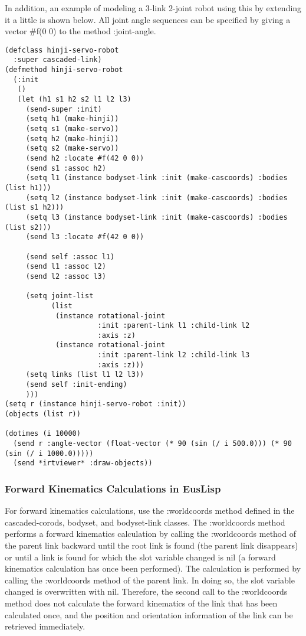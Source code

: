 In addition, an example of modeling a 3-link 2-joint robot using this by extending it a little is shown below. All joint angle sequences can be specified by giving a vector \#f(0 0) to the method :joint-angle.
{\baselineskip=10pt
\begin{verbatim}
(defclass hinji-servo-robot
  :super cascaded-link)
(defmethod hinji-servo-robot
  (:init
   ()
   (let (h1 s1 h2 s2 l1 l2 l3)
     (send-super :init)
     (setq h1 (make-hinji))
     (setq s1 (make-servo))
     (setq h2 (make-hinji))
     (setq s2 (make-servo))
     (send h2 :locate #f(42 0 0))
     (send s1 :assoc h2)
     (setq l1 (instance bodyset-link :init (make-cascoords) :bodies (list h1)))
     (setq l2 (instance bodyset-link :init (make-cascoords) :bodies (list s1 h2)))
     (setq l3 (instance bodyset-link :init (make-cascoords) :bodies (list s2)))
     (send l3 :locate #f(42 0 0))

     (send self :assoc l1)
     (send l1 :assoc l2)
     (send l2 :assoc l3)

     (setq joint-list
           (list
            (instance rotational-joint
                      :init :parent-link l1 :child-link l2
                      :axis :z)
            (instance rotational-joint
                      :init :parent-link l2 :child-link l3
                      :axis :z)))
     (setq links (list l1 l2 l3))
     (send self :init-ending)
     )))
(setq r (instance hinji-servo-robot :init))
(objects (list r))

(dotimes (i 10000)
  (send r :angle-vector (float-vector (* 90 (sin (/ i 500.0))) (* 90 (sin (/ i 1000.0)))))
  (send *irtviewer* :draw-objects))
\end{verbatim}
}

\subsubsection{Forward Kinematics Calculations in EusLisp}

For forward kinematics calculations, use the :worldcoords method defined in the cascaded-corods, bodyset, and bodyset-link classes.
The :worldcoords method performs a forward kinematics calculation by calling the :worldcoords method of the parent link backward until the root link is found (the parent link disappears) or until a link is found for which the slot variable changed is nil (a forward kinematics calculation has once been performed). The calculation is performed by calling the :worldcoords method of the parent link. In doing so, the slot variable changed is overwritten with nil.
Therefore, the second call to the :worldcoords method does not calculate the forward kinematics of the link that has been calculated once, and the position and orientation information of the link can be retrieved immediately.

